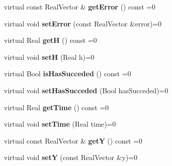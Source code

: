 \begin{DoxyCompactItemize}
\item 
\hypertarget{classISolverData_ac9bd0d0902bf6c7a47d1b82097e734b9}{
virtual const RealVector \& {\bfseries getError} () const =0}
\label{classISolverData_ac9bd0d0902bf6c7a47d1b82097e734b9}

\item 
\hypertarget{classISolverData_adf0c47be80ef98e377e2bcc99ce1ecae}{
virtual void {\bfseries setError} (const RealVector \&error)=0}
\label{classISolverData_adf0c47be80ef98e377e2bcc99ce1ecae}

\item 
\hypertarget{classISolverData_addcac56958d8b75157a19cf3046ddbed}{
virtual Real {\bfseries getH} () const =0}
\label{classISolverData_addcac56958d8b75157a19cf3046ddbed}

\item 
\hypertarget{classISolverData_acdfe4a78fbb4919abc4151afe355d786}{
virtual void {\bfseries setH} (Real h)=0}
\label{classISolverData_acdfe4a78fbb4919abc4151afe355d786}

\item 
\hypertarget{classISolverData_ae4f2dee77edb21d09aa139538499f6f9}{
virtual Bool {\bfseries isHasSucceded} () const =0}
\label{classISolverData_ae4f2dee77edb21d09aa139538499f6f9}

\item 
\hypertarget{classISolverData_ac3e1f3066da46cf8f1835bc7f472cb8e}{
virtual void {\bfseries setHasSucceded} (Bool hasSucceded)=0}
\label{classISolverData_ac3e1f3066da46cf8f1835bc7f472cb8e}

\item 
\hypertarget{classISolverData_ae828c5447215a66209c5aac4a4f41cb1}{
virtual Real {\bfseries getTime} () const =0}
\label{classISolverData_ae828c5447215a66209c5aac4a4f41cb1}

\item 
\hypertarget{classISolverData_a447682e1f88025ed4f9ecd0a51b3e268}{
virtual void {\bfseries setTime} (Real time)=0}
\label{classISolverData_a447682e1f88025ed4f9ecd0a51b3e268}

\item 
\hypertarget{classISolverData_ade791cc49459d83f06c2af28444355b3}{
virtual const RealVector \& {\bfseries getY} () const =0}
\label{classISolverData_ade791cc49459d83f06c2af28444355b3}

\item 
\hypertarget{classISolverData_a502bbea5e7ee8a30e931225e2b688d53}{
virtual void {\bfseries setY} (const RealVector \&y)=0}
\label{classISolverData_a502bbea5e7ee8a30e931225e2b688d53}


\end{DoxyCompactItemize}
